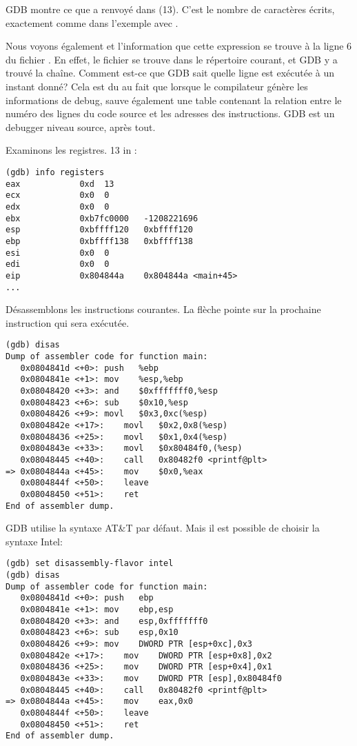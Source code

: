 \ac{GDB} montre ce que \printf a renvoyé dans \EAX (13).
C'est le nombre de caractères écrits, exactement comme dans l'exemple avec \olly.

Nous voyons également  et l'information que cette expression se trouve
à la ligne 6 du fichier .
En effet, le fichier  se trouve dans le répertoire courant, et \ac{GDB}
y a trouvé la chaîne.
Comment est-ce que \ac{GDB} sait quelle ligne est exécutée à un instant donné?
Cela est du au fait que lorsque le compilateur génère les informations de debug,
sauve également une table contenant la relation entre le numéro des lignes du code
source et les adresses des instructions.
GDB est un debugger niveau source, après tout.

Examinons les registres.
13 in \EAX:

\begin{lstlisting}
(gdb) info registers
eax            0xd	13
ecx            0x0	0
edx            0x0	0
ebx            0xb7fc0000	-1208221696
esp            0xbffff120	0xbffff120
ebp            0xbffff138	0xbffff138
esi            0x0	0
edi            0x0	0
eip            0x804844a	0x804844a <main+45>
...
\end{lstlisting}

Désassemblons les instructions courantes.
La flèche pointe sur la prochaine instruction qui sera exécutée.

\begin{lstlisting}[style=customasmx86]
(gdb) disas
Dump of assembler code for function main:
   0x0804841d <+0>:	push   %ebp
   0x0804841e <+1>:	mov    %esp,%ebp
   0x08048420 <+3>:	and    $0xfffffff0,%esp
   0x08048423 <+6>:	sub    $0x10,%esp
   0x08048426 <+9>:	movl   $0x3,0xc(%esp)
   0x0804842e <+17>:	movl   $0x2,0x8(%esp)
   0x08048436 <+25>:	movl   $0x1,0x4(%esp)
   0x0804843e <+33>:	movl   $0x80484f0,(%esp)
   0x08048445 <+40>:	call   0x80482f0 <printf@plt>
=> 0x0804844a <+45>:	mov    $0x0,%eax
   0x0804844f <+50>:	leave  
   0x08048450 <+51>:	ret    
End of assembler dump.
\end{lstlisting}

\ac{GDB} utilise la syntaxe AT\&T par défaut.
Mais il est possible de choisir la syntaxe Intel:

\begin{lstlisting}[style=customasmx86]
(gdb) set disassembly-flavor intel
(gdb) disas
Dump of assembler code for function main:
   0x0804841d <+0>:	push   ebp
   0x0804841e <+1>:	mov    ebp,esp
   0x08048420 <+3>:	and    esp,0xfffffff0
   0x08048423 <+6>:	sub    esp,0x10
   0x08048426 <+9>:	mov    DWORD PTR [esp+0xc],0x3
   0x0804842e <+17>:	mov    DWORD PTR [esp+0x8],0x2
   0x08048436 <+25>:	mov    DWORD PTR [esp+0x4],0x1
   0x0804843e <+33>:	mov    DWORD PTR [esp],0x80484f0
   0x08048445 <+40>:	call   0x80482f0 <printf@plt>
=> 0x0804844a <+45>:	mov    eax,0x0
   0x0804844f <+50>:	leave  
   0x08048450 <+51>:	ret    
End of assembler dump.
\end{lstlisting}

